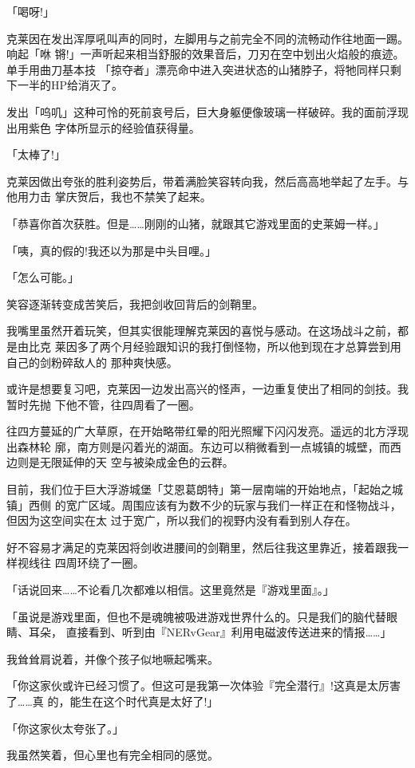 \documentclass[11pt]{book}
\begin{document}
「喝呀!」

克莱因在发出浑厚吼叫声的同时，左脚用与之前完全不同的流畅动作往地面一踢。响起「咻
锵!」一声听起来相当舒服的效果音后，刀刃在空中划出火焰般的痕迹。单手用曲刀基本技
「掠夺者」漂亮命中进入突进状态的山猪脖子，将牠同样只剩下一半的HP给消灭了。

发出「呜叽」这种可怜的死前哀号后，巨大身躯便像玻璃一样破碎。我的面前浮现出用紫色
字体所显示的经验值获得量。

「太棒了!」

克莱因做出夸张的胜利姿势后，带着满脸笑容转向我，然后高高地举起了左手。与他用力击
掌庆贺后，我也不禁笑了起来。

「恭喜你首次获胜。但是……刚刚的山猪，就跟其它游戏里面的史莱姆一样。」

「咦，真的假的!我还以为那是中头目哩。」

「怎么可能。」

笑容逐渐转变成苦笑后，我把剑收回背后的剑鞘里。

我嘴里虽然开着玩笑，但其实很能理解克莱因的喜悦与感动。在这场战斗之前，都是由比克
莱因多了两个月经验跟知识的我打倒怪物，所以他到现在才总算尝到用自己的剑粉碎敌人的
那种爽快感。

或许是想要复习吧，克莱因一边发出高兴的怪声，一边重复使出了相同的剑技。我暂时先抛
下他不管，往四周看了一圈。

往四方蔓延的广大草原，在开始略带红晕的阳光照耀下闪闪发亮。遥远的北方浮现出森林轮
廓，南方则是闪着光的湖面。东边可以稍微看到一点城镇的城壁，而西边则是无限延伸的天
空与被染成金色的云群。

目前，我们位于巨大浮游城堡「艾恩葛朗特」第一层南端的开始地点，「起始之城镇」西侧
的宽广区域。周围应该有为数不少的玩家与我们一样正在和怪物战斗，但因为这空间实在太
过于宽广，所以我们的视野内没有看到别人存在。

好不容易才满足的克莱因将剑收进腰间的剑鞘里，然后往我这里靠近，接着跟我一样视线往
四周环绕了一圈。

「话说回来……不论看几次都难以相信。这里竟然是『游戏里面』。」

「虽说是游戏里面，但也不是魂魄被吸进游戏世界什么的。只是我们的脑代替眼睛、耳朵，
直接看到、听到由『NERvGear』利用电磁波传送进来的情报……」

我耸耸肩说着，并像个孩子似地噘起嘴来。

「你这家伙或许已经习惯了。但这可是我第一次体验『完全潜行』!这真是太厉害了……真
的，能生在这个时代真是太好了!」

「你这家伙太夸张了。」

我虽然笑着，但心里也有完全相同的感觉。
\end{document}
